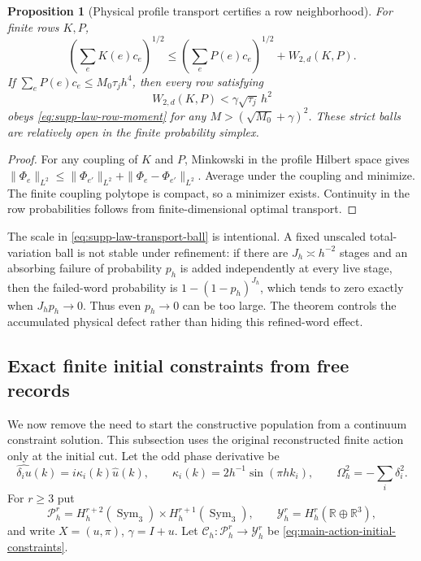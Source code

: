 \documentclass[11pt]{article}
\numberwithin{equation}{section}
\newtheorem{proposition}[proposition]{Proposition}
\theoremstyle{definition}
\theoremstyle{remark}
\begin{document}
\begin{proposition}[Physical profile transport certifies a row neighborhood]
\label{prop:supp-law-transport}
For finite rows $K,P$,
\begin{equation}
 \left(\sum_eK(e)c_e\right)^{1/2}
 \le\left(\sum_eP(e)c_e\right)^{1/2}+W_{2,d}(K,P).
 \label{eq:supp-law-transport-bound}
\end{equation}
If $\sum_eP(e)c_e\le M_0\tau_jh^4$, then every row satisfying
\begin{equation}
 W_{2,d}(K,P)<\gamma\sqrt{\tau_j}\,h^2
 \label{eq:supp-law-transport-ball}
\end{equation}
obeys \eqref{eq:supp-law-row-moment} for any
$M>(\sqrt{M_0}+\gamma)^2$.  These strict balls are relatively open in the
finite probability simplex.
\end{proposition}
\begin{proof}
For any coupling of $K$ and $P$, Minkowski in the profile Hilbert space gives
$\|\Phi_e\|_{L^2}\le\|\Phi_{e'}\|_{L^2}+\|\Phi_e-\Phi_{e'}\|_{L^2}$.
Average under the coupling and minimize.  The finite coupling polytope is
compact, so a minimizer exists.  Continuity in the row probabilities follows
from finite-dimensional optimal transport.
\end{proof}

The scale in \eqref{eq:supp-law-transport-ball} is intentional.  A fixed
unscaled total-variation ball is not stable under refinement: if there are
$J_h\asymp h^{-2}$ stages and an absorbing failure of probability $p_h$ is
added independently at every live stage, then the failed-word probability is
$1-(1-p_h)^{J_h}$, which tends to zero exactly when $J_hp_h\to0$.  Thus even
$p_h\to0$ can be too large.  The theorem controls the accumulated physical
defect rather than hiding this refined-word effect.

\subsection{Exact finite initial constraints from free records}

We now remove the need to start the constructive population from a continuum
constraint solution.  This subsection uses the original reconstructed finite
action only at the initial cut.  Let the odd phase derivative be
\begin{equation}
 \widehat{\delta_i u}(k)=i\kappa_i(k)\widehat u(k),
 \qquad \kappa_i(k)=2h^{-1}\sin(\pi hk_i),
 \qquad \Omega_h^2=-\sum_i\delta_i^2.
 \label{eq:supp-initial-phase-derivative}
\end{equation}
For $r\ge3$ put
\begin{equation}
 \mathcal P_h^r=H_h^{r+2}(\operatorname{Sym}_3)
                 \times H_h^{r+1}(\operatorname{Sym}_3),
 \qquad \mathcal Y_h^r=H_h^r(\mathbb R\oplus\mathbb R^3),
 \label{eq:supp-initial-spaces}
\end{equation}
and write $X=(u,\pi)$, $\gamma=I+u$.  Let
$\mathscr C_h:\mathcal P_h^r\to\mathcal Y_h^r$ be
\eqref{eq:main-action-initial-constraints}.
\end{document}
